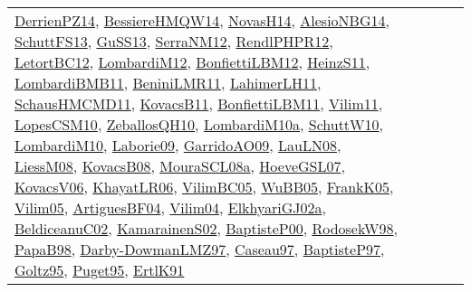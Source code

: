 {\begin{longtable}{lp{3cm}>{\raggedright}p{6cm}>{\raggedright}p{6cm}p{8cm}}
\href{papers/DerrienPZ14.pdf}{DerrienPZ14}\cite{DerrienPZ14}, \href{papers/BessiereHMQW14.pdf}{BessiereHMQW14}\cite{BessiereHMQW14}, \href{articles/NovasH14.pdf}{NovasH14}\cite{NovasH14}, \href{papers/AlesioNBG14.pdf}{AlesioNBG14}\cite{AlesioNBG14}, \href{papers/SchuttFS13.pdf}{SchuttFS13}\cite{SchuttFS13}, \href{papers/GuSS13.pdf}{GuSS13}\cite{GuSS13}, \href{papers/SerraNM12.pdf}{SerraNM12}\cite{SerraNM12}, \href{papers/RendlPHPR12.pdf}{RendlPHPR12}\cite{RendlPHPR12}, \href{papers/LetortBC12.pdf}{LetortBC12}\cite{LetortBC12}, \href{articles/LombardiM12.pdf}{LombardiM12}\cite{LombardiM12}, \href{papers/BonfiettiLBM12.pdf}{BonfiettiLBM12}\cite{BonfiettiLBM12}, \href{papers/HeinzS11.pdf}{HeinzS11}\cite{HeinzS11}, \href{papers/LombardiBMB11.pdf}{LombardiBMB11}\cite{LombardiBMB11}, \href{articles/BeniniLMR11.pdf}{BeniniLMR11}\cite{BeniniLMR11}, \href{papers/LahimerLH11.pdf}{LahimerLH11}\cite{LahimerLH11}, \href{articles/SchausHMCMD11.pdf}{SchausHMCMD11}\cite{SchausHMCMD11}, \href{articles/KovacsB11.pdf}{KovacsB11}\cite{KovacsB11}, \href{papers/BonfiettiLBM11.pdf}{BonfiettiLBM11}\cite{BonfiettiLBM11}, \href{papers/Vilim11.pdf}{Vilim11}\cite{Vilim11}, \href{articles/LopesCSM10.pdf}{LopesCSM10}\cite{LopesCSM10}, \href{articles/ZeballosQH10.pdf}{ZeballosQH10}\cite{ZeballosQH10}, \href{articles/LombardiM10a.pdf}{LombardiM10a}\cite{LombardiM10a}, \href{papers/SchuttW10.pdf}{SchuttW10}\cite{SchuttW10}, \href{papers/LombardiM10.pdf}{LombardiM10}\cite{LombardiM10}, \href{papers/Laborie09.pdf}{Laborie09}\cite{Laborie09}, \href{articles/GarridoAO09.pdf}{GarridoAO09}\cite{GarridoAO09}, \href{papers/LauLN08.pdf}{LauLN08}\cite{LauLN08}, \href{articles/LiessM08.pdf}{LiessM08}\cite{LiessM08}, \href{articles/KovacsB08.pdf}{KovacsB08}\cite{KovacsB08}, \href{papers/MouraSCL08a.pdf}{MouraSCL08a}\cite{MouraSCL08a}, \href{papers/HoeveGSL07.pdf}{HoeveGSL07}\cite{HoeveGSL07}, \href{papers/KovacsV06.pdf}{KovacsV06}\cite{KovacsV06}, \href{articles/KhayatLR06.pdf}{KhayatLR06}\cite{KhayatLR06}, \href{articles/VilimBC05.pdf}{VilimBC05}\cite{VilimBC05}, \href{papers/WuBB05.pdf}{WuBB05}\cite{WuBB05}, \href{papers/FrankK05.pdf}{FrankK05}\cite{FrankK05}, \href{papers/Vilim05.pdf}{Vilim05}\cite{Vilim05}, \href{papers/ArtiguesBF04.pdf}{ArtiguesBF04}\cite{ArtiguesBF04}, \href{papers/Vilim04.pdf}{Vilim04}\cite{Vilim04}, \href{papers/ElkhyariGJ02a.pdf}{ElkhyariGJ02a}\cite{ElkhyariGJ02a}, \href{papers/BeldiceanuC02.pdf}{BeldiceanuC02}\cite{BeldiceanuC02}, \href{papers/KamarainenS02.pdf}{KamarainenS02}\cite{KamarainenS02}, \href{articles/BaptisteP00.pdf}{BaptisteP00}\cite{BaptisteP00}, \href{papers/RodosekW98.pdf}{RodosekW98}\cite{RodosekW98}, \href{articles/PapaB98.pdf}{PapaB98}\cite{PapaB98}, \href{articles/Darby-DowmanLMZ97.pdf}{Darby-DowmanLMZ97}\cite{Darby-DowmanLMZ97}, \href{papers/Caseau97.pdf}{Caseau97}\cite{Caseau97}, \href{papers/BaptisteP97.pdf}{BaptisteP97}\cite{BaptisteP97}, \href{papers/Goltz95.pdf}{Goltz95}\cite{Goltz95}, \href{papers/Puget95.pdf}{Puget95}\cite{Puget95}, \href{papers/ErtlK91.pdf}{ErtlK91}\cite{ErtlK91}\\

\end{longtable}}

